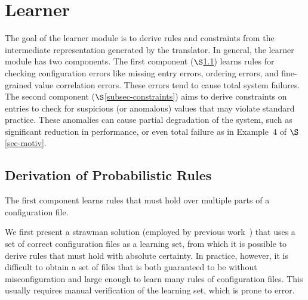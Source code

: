 \section{Learner}
\label{sec-learn}


The goal of the learner module is to derive rules and constraints from
the intermediate representation generated by the translator.
In general, the learner module has two components.
The first component ($\S$\ref{subsec-rules}) 
learns rules for checking configuration errors like
missing entry errors, ordering errors, and fine-grained value correlation errors. 
These errors tend to cause total system failures.
The second component ($\S$\ref{subsec-constraints}) 
aims to derive 
constraints on entries to check for suspicious (or anomalous) values 
that may violate standard practice. These anomalies can cause partial 
degradation of the system, 
such as significant reduction in performance, or even 
total failure as in Example~4 of $\S$\ref{sec-motiv}.

\subsection{Derivation of Probabilistic Rules}
\label{subsec-rules}

The first component learns rules 
that must hold over multiple parts of a configuration file.

We first present a strawman solution (employed by
previous work~\cite{santolucitoCAV, zhang14encore}) that uses 
a set of correct configuration files as a learning set, 
from which it is possible to derive rules 
that must hold with absolute certainty. 
In practice, however, it is difficult to obtain a set of files 
that is both guaranteed to be without misconfiguration 
and large enough to learn many rules of configuration files.
This usually requires manual verification of the learning set, 
which is prone to error.

